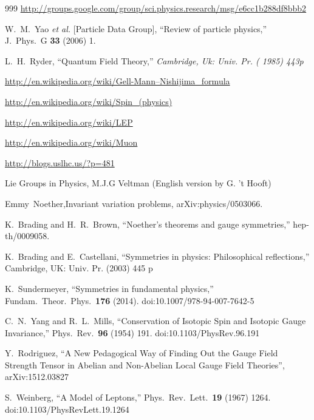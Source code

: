 \begin{thebibliography}{999}
\url{http://groups.google.com/group/sci.physics.research/msg/e6cc1b288df8bbb2}

 W.~M.~Yao {\it et al.}  [Particle Data Group],
  ``Review of particle physics,''
  J.\ Phys.\ G {\bf 33} (2006) 1.

  L.~H.~Ryder,
  ``Quantum Field Theory,''
{\it  Cambridge, Uk: Univ. Pr. ( 1985) 443p}

\url{http://en.wikipedia.org/wiki/Gell-Mann–Nishijima_formula}

\url{http://en.wikipedia.org/wiki/Spin_(physics)}

\url{http://en.wikipedia.org/wiki/LEP}

\url{http://en.wikipedia.org/wiki/Muon}

\url{http://blogs.uslhc.us/?p=481}

 Lie Groups in Physics, M.J.G Veltman (English version by G. 't Hooft)

 Emmy~Noether,Invariant variation problems, arXiv:physics/0503066.
  
  K.~Brading and H.~R.~Brown,
  ``Noether's theorems and gauge symmetries,''
  hep-th/0009058.


  K.~Brading and E.~Castellani,
  ``Symmetries in physics: Philosophical reflections,''
  Cambridge, UK: Univ. Pr. (2003) 445 p

  K.~Sundermeyer,
  ``Symmetries in fundamental physics,''
  Fundam.\ Theor.\ Phys.\  {\bf 176} (2014).
  doi:10.1007/978-94-007-7642-5


  C.~N.~Yang and R.~L.~Mills,
  ``Conservation of Isotopic Spin and Isotopic Gauge Invariance,''
  Phys.\ Rev.\  {\bf 96} (1954) 191.
  doi:10.1103/PhysRev.96.191

Y.~Rodriguez, ``A New Pedagogical Way of Finding Out the Gauge Field Strength Tensor in Abelian and Non-Abelian Local Gauge Field Theories'', arXiv:1512.03827



  S.~Weinberg,
  ``A Model of Leptons,''
  Phys.\ Rev.\ Lett.\  {\bf 19} (1967) 1264.
  doi:10.1103/PhysRevLett.19.1264


\end{thebibliography}
